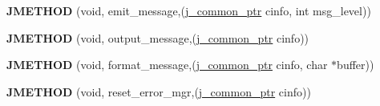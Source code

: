 \begin{DoxyCompactItemize}
\item 
\hypertarget{structjpeg__error__mgr_a73c0a027b6e6cb8ff2b7b0fc42f756f9}{{\bfseries J\-M\-E\-T\-H\-O\-D} (void, emit\-\_\-message,(\hyperlink{structjpeg__common__struct}{j\-\_\-common\-\_\-ptr} cinfo, int msg\-\_\-level))}\label{structjpeg__error__mgr_a73c0a027b6e6cb8ff2b7b0fc42f756f9}

\item 
\hypertarget{structjpeg__error__mgr_ac2989f8ef34acdd78ce26a9110a1c094}{{\bfseries J\-M\-E\-T\-H\-O\-D} (void, output\-\_\-message,(\hyperlink{structjpeg__common__struct}{j\-\_\-common\-\_\-ptr} cinfo))}\label{structjpeg__error__mgr_ac2989f8ef34acdd78ce26a9110a1c094}

\item 
\hypertarget{structjpeg__error__mgr_a5f1dfb51c337c36ae1bc5fae7f84528f}{{\bfseries J\-M\-E\-T\-H\-O\-D} (void, format\-\_\-message,(\hyperlink{structjpeg__common__struct}{j\-\_\-common\-\_\-ptr} cinfo, char $\ast$buffer))}\label{structjpeg__error__mgr_a5f1dfb51c337c36ae1bc5fae7f84528f}

\item 
\hypertarget{structjpeg__error__mgr_ac676478083167b3731995d7901bd4b6c}{{\bfseries J\-M\-E\-T\-H\-O\-D} (void, reset\-\_\-error\-\_\-mgr,(\hyperlink{structjpeg__common__struct}{j\-\_\-common\-\_\-ptr} cinfo))}\label{structjpeg__error__mgr_ac676478083167b3731995d7901bd4b6c}

\end{DoxyCompactItemize}
